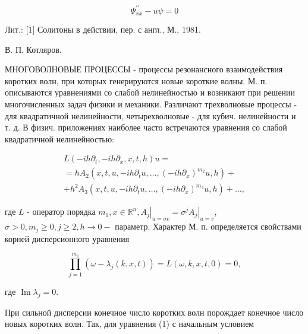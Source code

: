 \documentclass[10pt]{article}
\begin{document}
\[

\Psi_{x x}^{\prime \prime}-u \psi=0

\]



Лит.: [1] Солитоны в действии, пер. с англ., М., 1981.



В. П. Котляров.



МНОГОВОЛНОВЫЕ ПРОЦЕССЫ - процессы резонансного взаимодействия коротких волн, при которых генерируются новые короткие волны. М. п. описываются уравнениями со слабой нелинейностью и возникают при решении многочисленных задач физики и механики. Различают трехволновые процессы - для квадратичной нелинейности, четырехволновые - для кубич. нелинейности и т. д. В физич. приложениях наиболее часто встречаются уравнения со слабой квадратичной нелинейностью:



\[

\begin{gathered}

L\left(-i h \partial_{t},-i h \partial_{x}, x, t, h\right) u= \\

=h A_{2}\left(x, t, u,-i h \partial_{t} u, \ldots,\left(-i h \partial_{x}\right)^{m_{2}} u, h\right)+ \\

+h^{2} A_{3}\left(x, t, u,-i h \partial_{t} u, \ldots,\left(-i h \partial_{x}\right)^{m_{3}} u, h\right)+\ldots,

\end{gathered}

\]



где $L$ - оператор порядка $m_{1}, x \in \mathbb{R}^{n},\left.A_{j}\right|_{u=\sigma v}=\left.\sigma^{j} A_{j}\right|_{u=v}$, $\sigma>0, m_{j} \geqslant 0, j \geqslant 2, h \rightarrow 0-$ параметр. Характер М. п. определяется свойствами корней дисперсионного уравнения



\[

\prod_{j=1}^{m_{1}}\left(\omega-\lambda_{j}(k, x, t)\right)=L(\omega, k, x, t, 0)=0,

\]



где $\operatorname{Im} \lambda_{j}=0$.



При сильной дисперсии конечное число коротких волн порождает конечное число новых коротких волн. Так, для уравнения (1) с начальным условием
\end{document}
